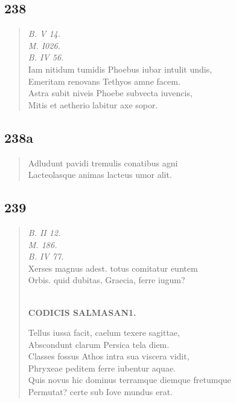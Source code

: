 \documentclass[11pt, a4paper]{report}
\begin{document}
            \subsection*{238}
      \begin{verse}
      \textit{B. V 14.} \\ \textit{M. I026.} \\ \textit{B. IV 56.} \\ Iam nitidum tumidis Phoebus iubar intulit undis, \\ Emeritam renovans Tethyos amne facem. \\ Astra subit niveis Phoebe subvecta iuvencis, \\ Mitis et aetherio labitur axe sopor. \\ 
      \end{verse}
  
            \subsection*{238a}
      \begin{verse}
      Adludunt pavidi tremulis conatibus agni \\ Lacteolasque animas lacteus umor alit. \\ 
      \end{verse}
  
            \subsection*{239}
      \begin{verse}
      \textit{B. II 12.} \\ \textit{M. 186.} \\ \textit{B. IV 77.} \\ Xerses magnus adest. totus comitatur euntem \\ Orbis. quid dubitas, Graecia, ferre iugum? \\ 
        ﻿\pagebreak 
    \begin{center} \textbf{CODICIS SALMASAN1.} \end{center} \marginpar{[197]} Tellus iussa facit, caelum texere sagittae, \\ Abscondunt clarum Persica tela diem. \\ Classes fossus Athos intra sua viscera vidit, \\ Phryxeae peditem ferre iubentur aquae. \\ Quis novus hic dominus terramque diemque fretumque \\ Permutat? certe sub Iove mundus erat. \\ 
      \end{verse}
  
\end{document}
